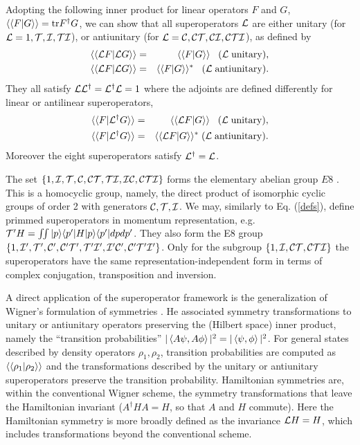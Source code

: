 Adopting the following inner product for linear operators $F$ and $G$, $\langle\langle F|G\rangle\rangle={\rm{tr}} F^\dagger G$,
we can show that all superoperators ${\cal L}$ are either unitary (for ${\cal L}=1,{\cal T},{\cal I},{\cal TI}$), or antiunitary (for ${\cal L}={\cal C}, {\cal CT},{\cal CI},{\cal CTI}$), as defined by
%
\begin{eqnarray}
\langle\langle {\cal L}F| {\cal L}G\rangle\rangle&=& \langle\langle F| G\rangle\rangle\;\;\;  ({\cal L}\; {\rm unitary}),
\\
\langle\langle {\cal L}F| {\cal L} G\rangle\rangle&=& \langle\langle  F| G\rangle\rangle^*\;\;\;  ({\cal L}\; {\rm antiunitary}).
\end{eqnarray}
%
%
They all satisfy ${\cal L}{\cal L}^\dagger={\cal L}^\dagger {\cal L}=1$
where the adjoints are defined differently for linear or antilinear superoperators,
\begin{eqnarray}
\langle\langle F| {\cal L}^\dagger G\rangle\rangle&=& \langle\langle {\cal L} F| G\rangle\rangle\;\;\;  ({\cal L}\; {\rm unitary}),
\\
\langle\langle F| {\cal L}^\dagger G\rangle\rangle&=& \langle\langle {\cal L} F| G\rangle\rangle^*\;  ({\cal L}\; {\rm antiunitary}).
\end{eqnarray}
%
Moreover the eight superoperators  satisfy ${\cal L}^\dagger={\cal L}$.

The set $\{1, \cal{I,T,C,CT,TI,IC,CTI}\}$ forms the elementary abelian group $E8$ \cite{Rose2009}.
This is a homocyclic group, namely, the direct product of isomorphic
cyclic groups of order 2 with generators $\cal{C,T,I}$. We may, similarly to Eq. (\ref{defs}), define primmed superoperators in momentum representation, e.g. ${\cal T'} H =\int\!\!\int |p\rangle \langle p'|H|p\rangle\langle p'| dp dp'$. They also form the E8 group
$\{1, \cal{I',T',C',C'T',T'I',I'C',C'T'I'}\}$. Only for the subgroup $\{1, \cal{I,CT,CTI}\}$ the superoperators have the same representation-independent form in terms of complex conjugation, transposition and inversion.

A direct application of the superoperator framework is the generalization of Wigner's
formulation of symmetries \cite{Wigner1959}. He associated symmetry transformations to unitary or antiunitary operators preserving the (Hilbert space) inner product, namely the ``transition probabilities'' $|\expval{A\psi,A\phi}|^2=|\expval{\psi,\phi}|^2$.
For general states described by density operators $\rho_1,\rho_2$, transition probabilities are computed as $\langle\langle \rho_1|\rho_2\rangle\rangle$
and the transformations described by the unitary or antiunitary superoperators preserve the
transition probability. Hamiltonian symmetries are, within the conventional Wigner scheme, the  symmetry transformations that leave the Hamiltonian invariant ($A^\dagger H A=H$, so that $A$ and $H$ commute). Here the Hamiltonian symmetry is more broadly defined  as
the invariance ${\cal L}H=H$, which includes transformations  beyond the conventional scheme.


